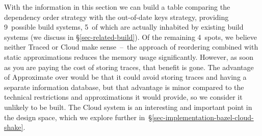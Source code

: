 With the information in this section we can build a table comparing the
dependency order strategy with the out-of-date keys strategy, providing 9~possible
build systems, 5~of which are actually inhabited by existing build systems
(we discuss \Ninja \cite{ninja} in \S\ref{sec-related-build}). Of the
remaining 4~spots, we believe neither Traced or Cloud \Excel make sense~--~the
\Excel approach of reordering combined with static approximations reduces
the memory usage significantly. However, as soon as you are paying the cost of
storing traces, that benefit is gone. The advantage of Approximate \Shake over
\Shake would be that it could avoid storing traces and having a separate
information database, but that advantage is minor compared to the technical
restrictions and approximations it would provide, so we consider it unlikely
to be built. The Cloud \Shake system is an interesting and important point in
the design space, which we explore further
in~\S\ref{sec-implementation-bazel-cloud-shake}.
